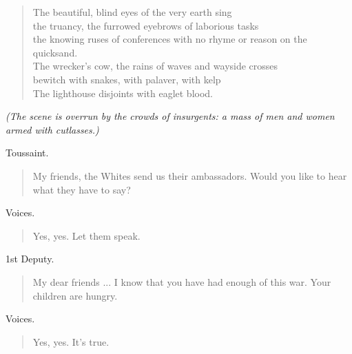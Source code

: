 \documentclass[letterpaper,article,12pt,oneside,notitlepage]{memoir}
\begin{document}
\begin{verse}
The beautiful, blind eyes of the very earth sing \\
the truancy, the furrowed eyebrows of laborious tasks \\
the knowing ruses of conferences with no rhyme or reason on the quicksand. \\
The wrecker's cow, the rains of waves and wayside crosses \\
bewitch with snakes, with palaver, with kelp \\
The lighthouse disjoints with eaglet blood. \\
\end{verse}

\textit{(The scene is overrun by the crowds of insurgents: a mass of men and women armed with cutlasses.)}

\begin{center}Toussaint.\end{center}

\begin{verse}
\indent My friends, the Whites send us their ambassadors. Would you like to hear what they have to say? \\
\end{verse}

\begin{center}Voices.\end{center}

\begin{verse}
\hspace{1cm} Yes, yes. Let them speak. \\
\end{verse}

\begin{center}1st Deputy.\end{center}

\begin{verse}
\indent My dear friends ... I know that you have had enough of this war. Your children are hungry. \\
\end{verse}

\clearpage

\begin{center}Voices.\end{center}

\begin{verse}
\hspace{1cm} Yes, yes. It's true. \\
\end{verse}
\end{document}
